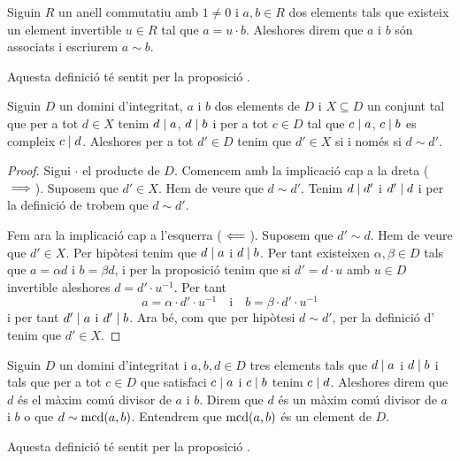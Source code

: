 \documentclass[../../Main.tex]{subfiles}
\begin{document}
	\begin{definition}
		\label{def:elements associats}
		Siguin \(R\) un anell commutatiu amb \(1\neq0\) i \(a,b\in R\) dos elements tals que existeix un element invertible \(u\in R\) tal que \(a=u\cdot b\). Aleshores direm que \(a\) i \(b\) són associats i escriurem \(a\sim b\).
		
		Aquesta definició té sentit per la proposició .
	\end{definition}
	\begin{proposition}
		\label{prop:màxim comú divisor anells}
		Siguin \(D\) un domini d'integritat, \(a\) i \(b\) dos elements de \(D\) i \(X\subseteq D\) un conjunt tal que per a tot \(d\in X\) tenim \(d\mathrel{|} a\), \(d\mathrel{|} b\) i per a tot \(c\in D\) tal que \(c\mathrel{|} a\), \(c\mathrel{|} b\) es compleix \(c\mathrel{|} d\). Aleshores per a tot \(d'\in D\) tenim que \(d'\in X\) si i només si \(d\sim d'\).
		\begin{proof}
			Sigui \(\cdot\) el producte de \(D\). Comencem amb la implicació cap a la dreta (\(\implies\)). Suposem que \(d'\in X\). Hem de veure que \(d\sim d'\). Tenim \(d\mathrel{|} d'\) i \(d'\mathrel{|} d\) i per la definició de  trobem que \(d\sim d'\).
			
			Fem ara la implicació cap a l'esquerra (\(\impliedby\)). Suposem que \(d'\sim d\). Hem de veure que \(d'\in X\). Per hipòtesi tenim que \(d\mathrel{|} a\) i \(d\mathrel{|} b\). Per tant existeixen \(\alpha,\beta\in D\) tals que \(a=\alpha d\) i \(b=\beta d\), i per la proposició  tenim que si \(d'=d\cdot u\) amb \(u\in D\) invertible aleshores \(d=d'\cdot u^{-1}\). Per tant
			\[a=\alpha\cdot d'\cdot u^{-1}\quad\text{i}\quad b=\beta\cdot d'\cdot u^{-1}\]
			i per tant \(d'\mathrel{|} a\) i \(d'\mathrel{|} b\). Ara bé, com que per hipòtesi \(d\sim d'\), per la definició d' tenim que \(d'\in X\).
		\end{proof}
	\end{proposition}
	\begin{definition}
		\label{def:màxim comú divisor anells}
		\label{def:mcd anells}
		Siguin \(D\) un domini d'integritat i \(a,b,d\in D\) tres elements tals que \(d\mathrel{|} a\) i \(d\mathrel{|} b\) i tals que per a tot \(c\in D\) que satisfaci \(c\mathrel{|} a\) i \(c\mathrel{|} b\) tenim \(c\mathrel{|} d\). Aleshores direm que \(d\) és el màxim comú divisor de \(a\) i \(b\). Direm que \(d\) és un màxim comú divisor de \(a\) i \(b\) o que \(d\sim\operatorname{mcd}(a,b)\).
		Entendrem que \(\operatorname{mcd}(a,b)\) és un element de \(D\).
		
		Aquesta definició té sentit per la proposició .
	\end{definition}
\end{document}
